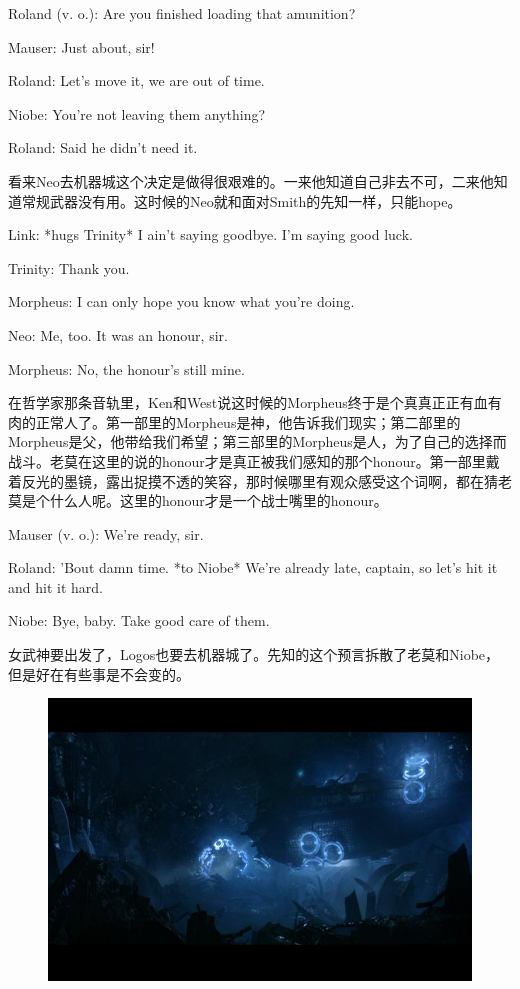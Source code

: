 \documentclass[UTF8]{ctexart}
\newenvironment{myquote}{\color{green} \setlength{\leftskip}{6em} \setlength{\rightskip}{4em} \setlength{\parindent}{-2em}}{\par}
\begin{document}
\begin{myquote}
Roland (v. o.): Are you finished loading that amunition?

Mauser: Just about, sir!

Roland: Let's move it, we are out of time.

Niobe: You're not leaving them anything?

Roland: Said he didn't need it.
\end{myquote}

看来Neo去机器城这个决定是做得很艰难的。一来他知道自己非去不可，二来他知道常规武器没有用。这时候的Neo就和面对Smith的先知一样，只能hope。

\begin{myquote}
Link: *hugs Trinity* I ain't saying goodbye. I'm saying good luck.

Trinity: Thank you.

Morpheus: I can only hope you know what you're doing.

Neo: Me, too. It was an honour, sir.

Morpheus: No, the honour's still mine.
\end{myquote}

在哲学家那条音轨里，Ken和West说这时候的Morpheus终于是个真真正正有血有肉的正常人了。第一部里的Morpheus是神，他告诉我们现实；第二部里的Morpheus是父，他带给我们希望；第三部里的Morpheus是人，为了自己的选择而战斗。老莫在这里的说的honour才是真正被我们感知的那个honour。第一部里戴着反光的墨镜，露出捉摸不透的笑容，那时候哪里有观众感受这个词啊，都在猜老莫是个什么人呢。这里的honour才是一个战士嘴里的honour。

\begin{myquote}
Mauser (v. o.): We're ready, sir.

Roland: 'Bout damn time. *to Niobe* We're already late, captain, so let's hit it and hit it hard.

Niobe: Bye, baby. Take good care of them.
\end{myquote}

女武神要出发了，Logos也要去机器城了。先知的这个预言拆散了老莫和Niobe，但是好在有些事是不会变的。

\begin{figure}[htb]
\centering
\includegraphics[width=0.5\linewidth]{fig/0c47bd3135fd92a85fdf0e64.jpg}
\end{figure}
\end{document}

